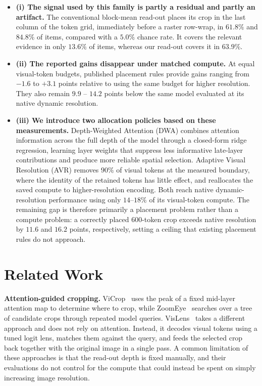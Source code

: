\documentclass{article} %
\begin{document}
\begin{itemize}
    \item \textbf{(i) The signal used by this family is partly a residual and partly an artifact.} The conventional block-mean read-out places its crop in the last column of the token grid, immediately before a raster row-wrap, in $61.8\%$ and $84.8\%$ of items, compared with a $5.0\%$ chance rate. It covers the relevant evidence in only $13.6\%$ of items, whereas our read-out covers it in $63.9\%$.

    \item \textbf{(ii) The reported gains disappear under matched compute.} At equal visual-token budgets, published placement rules provide gains ranging from $-1.6$ to $+3.1$ points relative to using the same budget for higher resolution. They also remain $9.9$ -- $14.2$ points below the same model evaluated at its native dynamic resolution.

    \item \textbf{(iii) We introduce two allocation policies based on these measurements.} Depth-Weighted Attention (DWA) combines attention information across the full depth of the model through a closed-form ridge regression, learning layer weights that suppress less informative late-layer contributions and produce more reliable spatial selection. Adaptive Visual Resolution (AVR) removes $90\%$ of visual tokens at the measured boundary, where the identity of the retained tokens has little effect, and reallocates the saved compute to higher-resolution encoding. Both reach native dynamic-resolution performance using only $14$--$18\%$ of its visual-token compute. The remaining gap is therefore primarily a placement problem rather than a compute problem: a correctly placed $600$-token crop exceeds native resolution by $11.6$ and $16.2$ points, respectively, setting a ceiling that existing placement rules do not approach.
\end{itemize}

\section{Related Work}
\textbf{Attention-guided cropping.} ViCrop~\citep{vicrop} uses the peak of a fixed mid-layer attention map to determine where to crop, while ZoomEye~\citep{zoomeye} searches over a tree of candidate crops through repeated model queries. VisLens~\citep{vislens} takes a different approach and does not rely on attention. Instead, it decodes visual tokens using a tuned logit lens, matches them against the query, and feeds the selected crop back together with the original image in a single pass. A common limitation of these approaches is that the read-out depth is fixed manually, and their evaluations do not control for the compute that could instead be spent on simply increasing image resolution.
\end{document}
